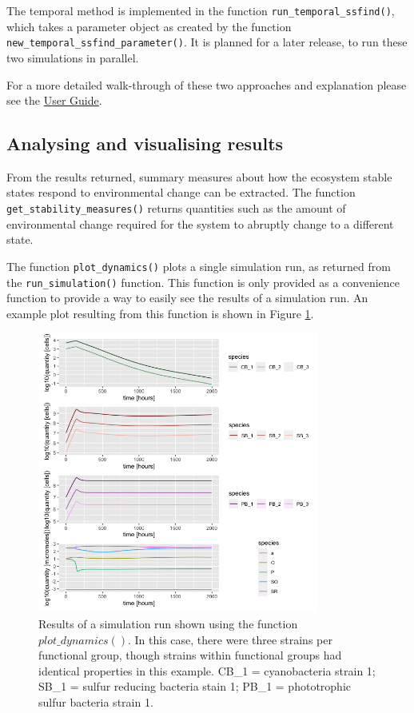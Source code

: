\documentclass[]{elsarticle} %
\begin{document}
The temporal method is implemented in the function
\texttt{run\_temporal\_ssfind()}, which takes a parameter object as
created by the function \texttt{new\_temporal\_ssfind\_parameter()}. It
is planned for a later release, to run these two simulations in
parallel.

For a more detailed walk-through of these two approaches and explanation
please see the
\href{https://uzh-peg.r-universe.dev/articles/microxanox/User-guide.html}{User
Guide}.

\hypertarget{analysing-and-visualising-results}{%
\subsection{Analysing and visualising
results}\label{analysing-and-visualising-results}}

From the results returned, summary measures about how the ecosystem
stable states respond to environmental change can be extracted. The
function \texttt{get\_stability\_measures()} returns quantities such as
the amount of environmental change required for the system to abruptly
change to a different state.

The function \texttt{plot\_dynamics()} plots a single simulation run, as
returned from the \texttt{run\_simulation()} function. This function is
only provided as a convenience function to provide a way to easily see
the results of a simulation run. An example plot resulting from this
function is shown in Figure \ref{fig:plot-dynamics}.

\begin{figure}

{\centering \includegraphics[width=350px]{figures/ug_three_strains_dynamics} 

}

\caption{Results of a simulation run shown using the function $plot\_dynamics()$. In this case, there were three strains per functional group, though strains within functional groups had identical properties in this example. CB\_1 = cyanobacteria strain 1; SB\_1 = sulfur reducing bacteria stain 1; PB\_1 = phototrophic sulfur bacteria strain 1.}\label{fig:plot-dynamics}
\end{figure}
\end{document}
